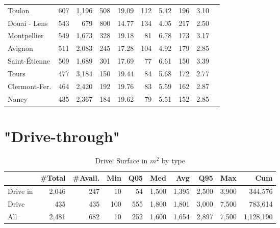 \documentclass[11pt]{article}
\begin{document}
\begin{table}[H]
\begin{tabular}{llrrrrrrrr}
          Toulon &        607 &      1,196 &          508 &      19.09 &        112 &       5.42 &        196 &        3.10 \\
    Douai - Lens &        543 &        679 &          800 &      14.77 &        134 &       4.05 &        217 &        2.50 \\
     Montpellier &        549 &      1,673 &          328 &      19.18 &         81 &       6.78 &        173 &        3.17 \\
         Avignon &        511 &      2,083 &          245 &      17.28 &        104 &       4.92 &        179 &        2.85 \\
   Saint-Étienne &        509 &      1,689 &          301 &      17.69 &         77 &       6.61 &        150 &        3.39 \\
           Tours &        477 &      3,184 &          150 &      19.44 &         84 &       5.68 &        172 &        2.77 \\
   Clermont-Fer. &        464 &      2,420 &          192 &      19.76 &         83 &       5.59 &        162 &        2.87 \\
           Nancy &        435 &      2,367 &          184 &      19.62 &         79 &       5.51 &        152 &        2.85 \\
\bottomrule
\end{tabular}

\end{table}

\clearpage

\appendix

\section{"Drive-through"}

\begin{table}[H]
\caption{Drive: Surface in $m^2$ by type}
\small

\begin{tabular}{lrrrrrrrrr}
\toprule
{} &     \#Total &    \#Avail. &        Min &        Q05 &        Med &        Avg &        Q95 &        Max &        Cum \\
\midrule
Drive in &      2,046 &        247 &         10 &         54 &      1,500 &      1,395 &      2,500 &      3,900 &    344,576 \\
Drive    &        435 &        435 &        100 &        555 &      1,800 &      1,801 &      3,000 &      7,500 &    783,614 \\
All      &      2,481 &        682 &         10 &        252 &      1,600 &      1,654 &      2,897 &      7,500 &  1,128,190 \\
\bottomrule
\end{tabular}

\end{table}
\end{document}
